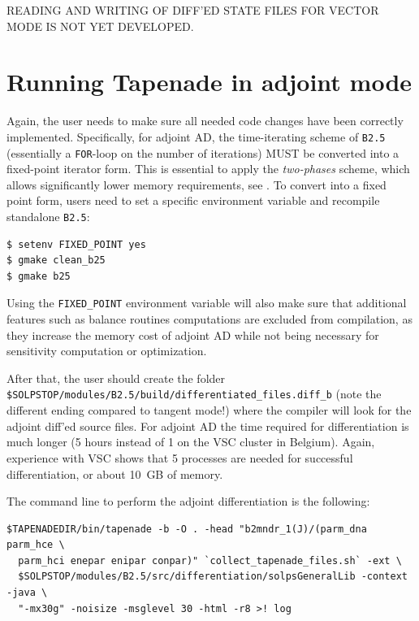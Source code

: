 READING AND WRITING OF DIFF'ED STATE FILES FOR VECTOR MODE IS NOT YET DEVELOPED.

\section{Running Tapenade in adjoint mode}\label{sec:runningTapeAdj}

Again, the user needs to make sure all needed code changes have been correctly implemented. Specifically, for adjoint AD, the time-iterating scheme of {\tt B2.5} (essentially a {\tt FOR}-loop on the number of iterations) MUST be converted into a fixed-point iterator form. This is essential to apply the \textit{two-phases} scheme, which allows significantly lower memory requirements, see \cite{griewank,carlijcp}. To convert into a fixed point form, users need to set a specific environment variable and recompile standalone {\tt B2.5}:
\begin{verbatim}
$ setenv FIXED_POINT yes
$ gmake clean_b25
$ gmake b25
\end{verbatim}
Using the {\tt FIXED\_POINT} environment variable will also make sure that additional features such as balance routines computations are excluded from compilation, as they increase the memory cost of adjoint AD while not being necessary for sensitivity computation or optimization.

After that, the user should create the folder {\tt \$SOLPSTOP/modules/B2.5/build/differentiated\_files\allowbreak.diff\_b} (note the different ending compared to tangent mode!) where the compiler will look for the adjoint diff'ed source files. For adjoint AD the time required for differentiation is much longer (5 hours instead of 1 on the VSC cluster in Belgium). Again, experience with VSC shows that 5 processes are needed for successful differentiation, or about 10~GB of memory.

The command line to perform the adjoint differentiation is the following:
\begin{verbatim}
$TAPENADEDIR/bin/tapenade -b -O . -head "b2mndr_1(J)/(parm_dna parm_hce \
  parm_hci enepar enipar conpar)" `collect_tapenade_files.sh` -ext \
  $SOLPSTOP/modules/B2.5/src/differentiation/solpsGeneralLib -context -java \
  "-mx30g" -noisize -msglevel 30 -html -r8 >! log
\end{verbatim}

